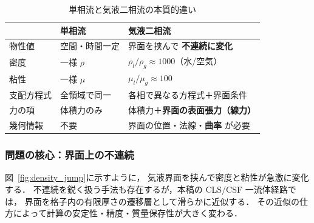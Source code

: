 \begin{table}[htbp]
\centering
\caption{単相流と気液二相流の本質的違い}
\renewcommand{\arraystretch}{\PaperTableArrayStretch}
\begin{tabular}{lll}
\hline
 & \textbf{単相流} & \textbf{気液二相流} \\
\hline
物性値     & 空間・時間一定            & 界面を挟んで \textbf{不連続に変化} \\
密度       & 一様 $\rho$               & $\rho_l / \rho_g \approx 1000$（水/空気） \\
粘性       & 一様 $\mu$                & $\mu_l / \mu_g \approx 100$ \\
支配方程式 & 全領域で同一              & 各相で異なる方程式＋界面条件 \\
力の項     & 体積力のみ                & 体積力＋\textbf{界面の表面張力（線力）} \\
幾何情報   & 不要                      & 界面の位置・法線・\textbf{曲率} が必要 \\
\hline
\end{tabular}
\end{table}

\subsubsection{問題の核心：界面上の不連続}

図~\ref{fig:density_jump}に示すように，
気液界面を挟んで密度と粘性が急激に変化する．
不連続を鋭く扱う手法も存在するが，本稿の CLS/CSF 一流体経路では，
界面を格子内の有限厚さの遷移層として滑らかに近似する．
その近似の仕方によって計算の安定性・精度・質量保存性が大きく変わる．

